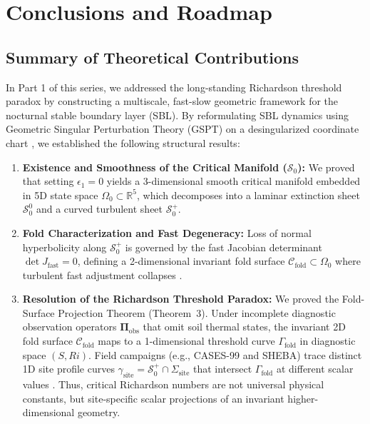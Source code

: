 \section{Conclusions and Roadmap}
\label{sec:conclusions}

\subsection{Summary of Theoretical Contributions}

In Part 1 of this series, we addressed the long-standing Richardson threshold paradox by constructing a multiscale, fast-slow geometric framework for the nocturnal stable boundary layer (SBL). By reformulating SBL dynamics using Geometric Singular Perturbation Theory (GSPT) on a desingularized coordinate chart \citep{Fenichel1979, Kuehn2015}, we established the following structural results:

\begin{enumerate}
    \item \textbf{Existence and Smoothness of the Critical Manifold ($\mathcal{S}_0$):} We proved that setting $\epsilon_1 = 0$ yields a 3-dimensional smooth critical manifold embedded in 5D state space $\Omega_0 \subset \mathbb{R}^5$, which decomposes into a laminar extinction sheet $\mathcal{S}_0^0$ and a curved turbulent sheet $\mathcal{S}_0^+$.

    \item \textbf{Fold Characterization and Fast Degeneracy:} Loss of normal hyperbolicity along $\mathcal{S}_0^+$ is governed by the fast Jacobian determinant $\det J_{\mathrm{fast}} = 0$, defining a 2-dimensional invariant fold surface $\mathcal{C}_{\mathrm{fold}} \subset \Omega_0$ where turbulent fast adjustment collapses \citep{VanDeWiel2002}.

    \item \textbf{Resolution of the Richardson Threshold Paradox:} We proved the Fold-Surface Projection Theorem (Theorem~3). Under incomplete diagnostic observation operators $\boldsymbol{\Pi}_{\mathrm{obs}}$ that omit soil thermal states, the invariant 2D fold surface $\mathcal{C}_{\mathrm{fold}}$ maps to a 1-dimensional threshold curve $\Gamma_{\mathrm{fold}}$ in diagnostic space $(S, Ri)$. Field campaigns (e.g., CASES-99 and SHEBA) trace distinct 1D site profile curves $\gamma_{\mathrm{site}} = \mathcal{S}_0^+ \cap \Sigma_{\mathrm{site}}$ that intersect $\Gamma_{\mathrm{fold}}$ at different scalar values \citep{Poulos2002CASES99, Uttal2002SHEBA}. Thus, critical Richardson numbers are not universal physical constants, but site-specific scalar projections of an invariant higher-dimensional geometry.
\end{enumerate}

